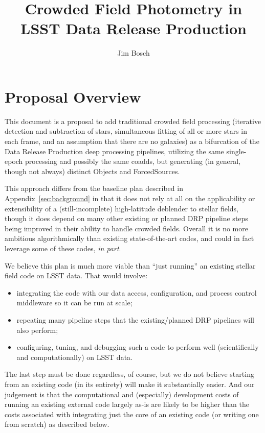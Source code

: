 \documentclass[DM,authoryear,toc]{lsstdoc}
\title{Crowded Field Photometry in LSST Data Release Production}
\author{%
Jim Bosch
}
\date{\vcsDate}
\begin{document}
\maketitle

\section{Proposal Overview}

This document is a proposal to add traditional crowded field processing (iterative detection and subtraction of stars, simultaneous fitting of all or more stars in each frame, and an assumption that there are no galaxies) as a bifurcation of the Data Release Production deep processing pipelines, utilizing the same single-epoch processing and possibly the same coadds, but generating (in general, though not always) distinct Objects and ForcedSources.

This approach differs from the baseline plan described in Appendix~\ref{sec:background} in that it does not rely at all on the applicability or extensibility of a (still-incomplete) high-latitude deblender to stellar fields, though it does depend on many other existing or planned DRP pipeline steps being improved in their ability to handle crowded fields.
Overall it is no more ambitious algorithmically than existing state-of-the-art codes, and could in fact leverage some of these codes, \emph{in part}.

We believe this plan is much more viable than ``just running'' an existing stellar field code on LSST data.
That would involve:
\begin{itemize}
  \item integrating the code with our data access, configuration, and process control middleware so it can be run at scale;
  \item repeating many pipeline steps that the existing/planned DRP pipelines will also perform;
  \item configuring, tuning, and debugging such a code to perform well (scientifically and computationally) on LSST data.
\end{itemize}
The last step must be done regardless, of course, but we do not believe starting from an existing code (in its entirety) will make it substantially easier.
And our judgement is that the computational and (especially) development costs of running an existing external code largely as-is are likely to be higher than the costs associated with integrating just the core of an existing code (or writing one from scratch) as described below.
\end{document}
